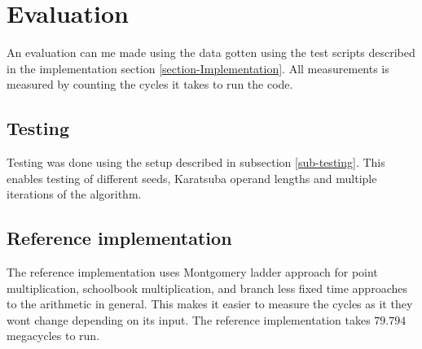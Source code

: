 \section{Evaluation}



An evaluation can me made using the data gotten using the test scripts described in the implementation section \ref{section-Implementation}. All measurements is measured by counting the cycles it takes to run the code.

\subsection{Testing}
Testing was done using the setup described in subsection \ref{sub-testing}. This enables testing of different seeds, Karatsuba operand lengths and multiple iterations of the algorithm.


\subsection{Reference implementation}
The reference implementation uses Montgomery ladder approach for point multiplication, schoolbook multiplication, and branch less fixed time approaches to the arithmetic in general. This makes it easier to measure the cycles as it they wont change depending on its input. The reference implementation takes $79.794$ megacycles to run.

